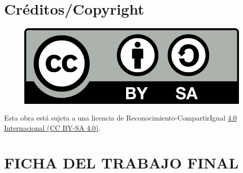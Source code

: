 \setcounter{page}{1} 
\pagestyle{plain}

\chapter*{Créditos/Copyright}



\vspace{1cm}

\begin{figure}[ht]
    \centering
	\includegraphics[scale=0.2]{images/license.png}
\end{figure}

Esta obra está sujeta a una licencia de Reconocimiento-CompartirIgual \href{https://creativecommons.org/licenses/by-sa/4.0/deed.es}{4.0 Internacional (CC BY-SA 4.0)}.

\chapter*{FICHA DEL TRABAJO FINAL}

